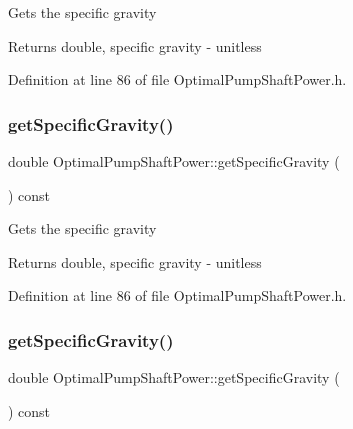 Gets the specific gravity \begin{DoxyReturn}{Returns}
double, specific gravity -\/ unitless 
\end{DoxyReturn}


Definition at line 86 of file Optimal\+Pump\+Shaft\+Power.\+h.

\mbox{\label{class_optimal_pump_shaft_power_a607d32c56edece639e03007adc1bf325}} 
\subsubsection{\texorpdfstring{get\+Specific\+Gravity()}{getSpecificGravity()}\hspace{0.1cm}{\footnotesize\ttfamily [2/3]}}
{\footnotesize\ttfamily double Optimal\+Pump\+Shaft\+Power\+::get\+Specific\+Gravity (\begin{DoxyParamCaption}{ }\end{DoxyParamCaption}) const\hspace{0.3cm}{\ttfamily [inline]}}

Gets the specific gravity \begin{DoxyReturn}{Returns}
double, specific gravity -\/ unitless 
\end{DoxyReturn}


Definition at line 86 of file Optimal\+Pump\+Shaft\+Power.\+h.

\mbox{\label{class_optimal_pump_shaft_power_a607d32c56edece639e03007adc1bf325}} 
\subsubsection{\texorpdfstring{get\+Specific\+Gravity()}{getSpecificGravity()}\hspace{0.1cm}{\footnotesize\ttfamily [3/3]}}
{\footnotesize\ttfamily double Optimal\+Pump\+Shaft\+Power\+::get\+Specific\+Gravity (\begin{DoxyParamCaption}{ }\end{DoxyParamCaption}) const\hspace{0.3cm}{\ttfamily [inline]}}

